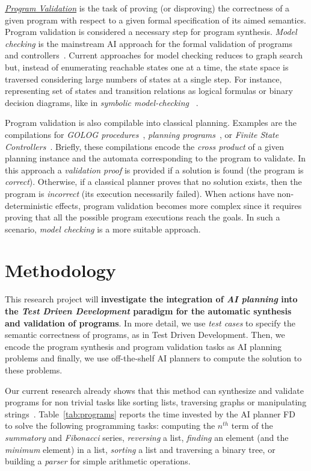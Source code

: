 \documentclass[10pt,a4paper]{paper}
\begin{document}
{\underline{\em Program Validation}} is the task of proving (or disproving) the correctness of a given program with respect to a given formal specification of its aimed semantics. Program validation is considered a necessary step for program synthesis. {\em Model checking} is the mainstream AI approach for the formal validation of programs and controllers~\cite{clarke1999model}. Current approaches for model checking reduces to graph search but, instead of enumerating reachable states one at a time, the state space is traversed considering large numbers of states at a single step. For instance, representing set of states and transition relations as logical formulas or binary decision diagrams, like in {\em symbolic model-checking} ~\cite{mcmillan1993symbolic}.

Program validation is also compilable into classical planning. Examples are the compilations for {\em {\sc GOLOG} procedures}~\cite{baier2007exploiting}, {\em planning programs}~\cite{segovia:programs:AIJ19}, or {\em Finite State Controllers}~\cite{Geffner:FSM:AAAI10,sergio:aprograming:ijcai16,segovia:FSC:JAIR2018}. Briefly, these compilations encode the {\em cross product} of a given planning instance and the automata corresponding to the program to validate. In this approach a {\em validation proof} is provided if a solution is found (the program is {\em correct}). Otherwise, if a classical planner proves that no solution exists, then the program is {\em incorrect} (its execution necessarily failed). When actions have non-deterministic effects, program validation becomes more complex since it requires proving that all the possible program executions reach the goals. In such a scenario, {\em model checking} is a more suitable approach.
\newpage

\section{Methodology}
\label{sec:methodology}
This research project will {\bf investigate the integration of {\em AI planning} into the {\em Test Driven Development} paradigm for the automatic synthesis and validation of programs}. In more detail, we use {\em test cases} to specify the semantic correctness of programs, as in Test Driven Development. Then, we encode the program synthesis and program validation tasks as AI planning problems and finally, we use off-the-shelf AI planners to compute the solution to these problems.

Our current research already shows that this method can synthesize and validate programs for non trivial tasks like sorting lists, traversing graphs or manipulating strings~\cite{jimenez2015computing,sergio:aprograming:icaps16,sergio:aprogramingb:ijcai16,sergio:aprograming:ijcai16,segovia2017generating,segovia:FSC:JAIR2018,segovia:programs:AIJ19}. Table~\ref{tab:programs} reports the time invested by the AI planner {\sc FD}~\cite{helmert2006fast} to solve the following programming tasks: computing the $n^{th}$ term of the {\em summatory} and  {\em Fibonacci} series, {\em reversing} a list, {\em finding} an element (and the {\em minimum} element) in a list, {\em sorting} a list and traversing a binary tree, or building a {\em parser} for simple arithmetic operations. 
 
\end{document}
